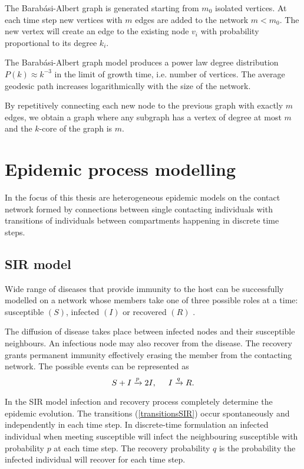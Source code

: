 \documentclass[times, utf8, diplomski]{fer}
\begin{document}
The Barab\'{a}si-Albert graph is generated starting from $m_0$ isolated vertices. At each time step new vertices with $m$ edges are added to the network $m < m_0$. The new vertex will create an edge to the existing node $v_i$  with probability proportional to its degree $k_i$.

 The Barab\'{a}si-Albert graph model produces a power law degree distribution $P(k) \approx k ^{-3}$  in the limit of growth time, i.e. number of vertices. The average geodesic path  increases logarithmically with the size of the network.

By repetitively connecting each new node to the previous graph with exactly $m$ edges, we obtain a graph where any subgraph has a vertex of degree at most $m$ and the $k$-core of the graph is $m$. 

\chapter{Epidemic process modelling}
\label{EPM}
In the focus of this thesis are heterogeneous epidemic models on the contact network formed by connections between single contacting individuals with transitions of individuals between compartments happening in discrete time steps.

\section{SIR model}
Wide range of diseases that provide immunity to the host can be successfully modelled on a network whose members take 	one of three possible roles at a time: susceptible $(S)$, infected $(I)$ or recovered $(R)$ \cite{Kermack1991}. 

The diffusion of disease takes place between infected nodes and their susceptible neighbours. An infectious node may also recover from the disease. The recovery grants permanent immunity effectively erasing the member from the contacting network.  The possible events can be represented as 
\begin{equation}
S + I \xrightarrow{p} 2I,\hspace{5mm}  I \xrightarrow{q} R.
\label{transitionsSIR}
\end{equation}

In the SIR model infection and recovery process completely determine the epidemic evolution. The transitions (\ref{transitionsSIR}) occur spontaneously and independently in each time step. In discrete-time formulation an infected individual when meeting susceptible will infect the neighbouring susceptible with probability $p$ at each time step. The recovery probability $q$ is the probability the infected individual will recover for each time step. 
\end{document}

